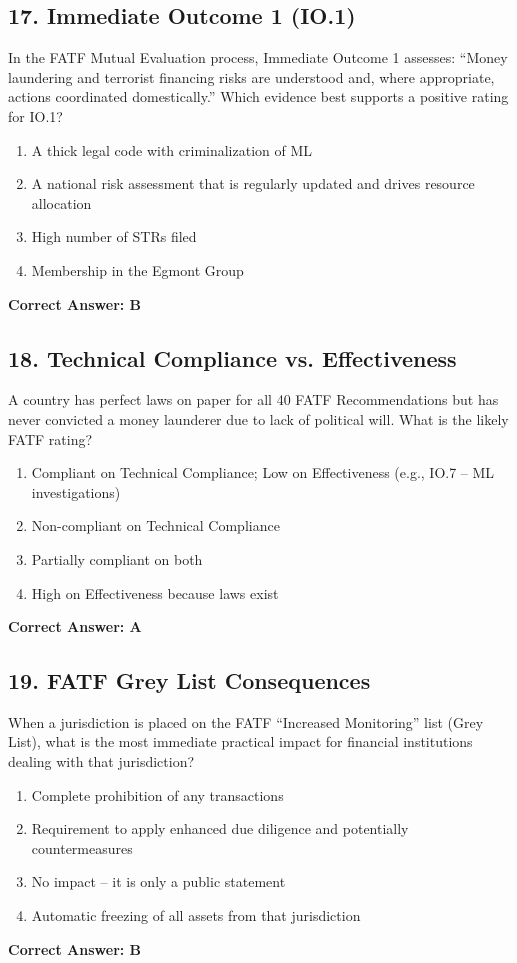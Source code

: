 \documentclass[11pt,a4paper]{article}
\begin{document}
	\subsection{17. Immediate Outcome 1 (IO.1)}
	In the FATF Mutual Evaluation process, Immediate Outcome 1 assesses: “Money laundering and terrorist financing risks are understood and, where appropriate, actions coordinated domestically.” Which evidence best supports a positive rating for IO.1?
	\begin{enumerate}[label=\Alph*.]
		\item A thick legal code with criminalization of ML
		\item A national risk assessment that is regularly updated and drives resource allocation
		\item High number of STRs filed
		\item Membership in the Egmont Group
	\end{enumerate}
	\textbf{Correct Answer: B}
	
	\subsection{18. Technical Compliance vs. Effectiveness}
	A country has perfect laws on paper for all 40 FATF Recommendations but has never convicted a money launderer due to lack of political will. What is the likely FATF rating?
	\begin{enumerate}[label=\Alph*.]
		\item Compliant on Technical Compliance; Low on Effectiveness (e.g., IO.7 – ML investigations)
		\item Non-compliant on Technical Compliance
		\item Partially compliant on both
		\item High on Effectiveness because laws exist
	\end{enumerate}
	\textbf{Correct Answer: A}
	
	\subsection{19. FATF Grey List Consequences}
	When a jurisdiction is placed on the FATF “Increased Monitoring” list (Grey List), what is the most immediate practical impact for financial institutions dealing with that jurisdiction?
	\begin{enumerate}[label=\Alph*.]
		\item Complete prohibition of any transactions
		\item Requirement to apply enhanced due diligence and potentially countermeasures
		\item No impact – it is only a public statement
		\item Automatic freezing of all assets from that jurisdiction
	\end{enumerate}
	\textbf{Correct Answer: B}
	
\end{document}
